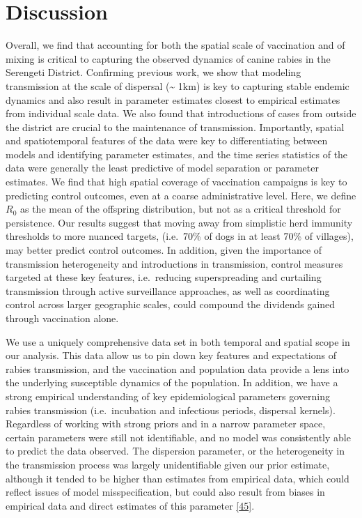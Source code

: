 \documentclass[
  oneside]{book}
\begin{document}
\hypertarget{discussion-2}{%
\section{Discussion}\label{discussion-2}}

Overall, we find that accounting for both the spatial scale of vaccination and of mixing is critical to capturing the observed dynamics of canine rabies in the Serengeti District. Confirming previous work, we show that modeling transmission at the scale of dispersal (\textasciitilde{} 1km) is key to capturing stable endemic dynamics and also result in parameter estimates closest to empirical estimates from individual scale data. We also found that introductions of cases from outside the district are crucial to the maintenance of transmission. Importantly, spatial and spatiotemporal features of the data were key to differentiating between models and identifying parameter estimates, and the time series statistics of the data were generally the least predictive of model separation or parameter estimates. We find that high spatial coverage of vaccination campaigns is key to predicting control outcomes, even at a coarse administrative level. Here, we define \(R_{0}\) as the mean of the offspring distribution, but not as a critical threshold for persistence. Our results suggest that moving away from simplistic herd immunity thresholds to more nuanced targets, (i.e.~70\% of dogs in at least 70\% of villages), may better predict control outcomes. In addition, given the importance of transmission heterogeneity and introductions in transmission, control measures targeted at these key features, i.e.~reducing superspreading and curtailing transmission through active surveillance approaches, as well as coordinating control across larger geographic scales, could compound the dividends gained through vaccination alone.

We use a uniquely comprehensive data set in both temporal and spatial scope in our analysis. This data allow us to pin down key features and expectations of rabies transmission, and the vaccination and population data provide a lens into the underlying susceptible dynamics of the population. In addition, we have a strong empirical understanding of key epidemiological parameters governing rabies transmission (i.e.~incubation and infectious periods, dispersal kernels). Regardless of working with strong priors and in a narrow parameter space, certain parameters were still not identifiable, and no model was consistently able to predict the data observed. The dispersion parameter, or the heterogeneity in the transmission process was largely unidentifiable given our prior estimate, although it tended to be higher than estimates from empirical data, which could reflect issues of model misspecification, but could also result from biases in empirical data and direct estimates of this parameter \protect\hyperlink{ref-susswein2020}{{[}45{]}}.
\end{document}
